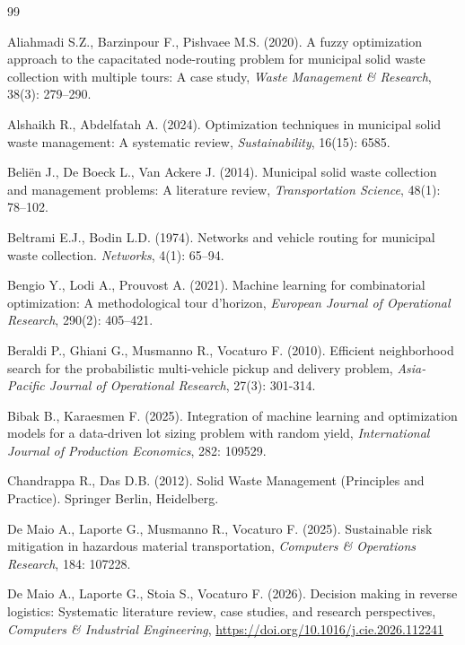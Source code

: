 \documentclass[preprint,11pt,authoryear]{elsarticle}
\begin{document}
\begin{thebibliography}{99}


Aliahmadi S.Z., Barzinpour F., Pishvaee M.S. (2020). A fuzzy optimization approach to the capacitated node-routing problem for municipal solid waste collection with multiple tours: A case study, \textit{Waste Management \& Research}, 38(3): 279--290.  

Alshaikh R., Abdelfatah A. (2024). Optimization techniques in municipal solid waste management: A systematic review, \textit{Sustainability}, 16(15): 6585. 

Beliën J., De Boeck L., Van Ackere J. (2014). Municipal solid waste collection and management problems: A literature review, \textit{Transportation Science}, 48(1): 78--102.

Beltrami E.J., Bodin L.D. (1974). Networks and vehicle routing for municipal waste collection. \textit{Networks}, 4(1): 65--94.

Bengio Y., Lodi A., Prouvost A. (2021). Machine learning for combinatorial optimization: A methodological tour d'horizon, \textit{European Journal of Operational Research}, 290(2): 405--421. 

Beraldi P., Ghiani G., Musmanno R., Vocaturo F. (2010). Efficient neighborhood search for the probabilistic multi-vehicle pickup and delivery problem, \textit{Asia-Pacific Journal of Operational Research}, 27(3): 301-314.

Bibak B., Karaesmen F. (2025). Integration of machine learning and optimization models for a data-driven lot sizing problem with random yield,  \textit{International Journal of Production Economics}, 282: 109529.

Chandrappa R., Das D.B. (2012). Solid Waste Management (Principles and Practice). Springer Berlin, Heidelberg.

De Maio A., Laporte G., Musmanno R., Vocaturo F. (2025). Sustainable risk mitigation in hazardous material transportation, \textit{Computers \& Operations Research}, 184: 107228. 

De Maio A., Laporte G., Stoia S., Vocaturo F. (2026). Decision making in reverse logistics: Systematic literature review, case studies, and
research perspectives, \textit{Computers \& Industrial Engineering}, \url{https://doi.org/10.1016/j.cie.2026.112241}


\end{thebibliography}
\end{document}
